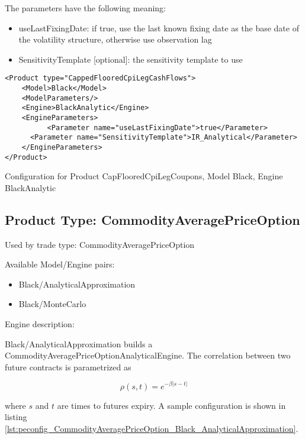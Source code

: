 The parameters have the following meaning:

\begin{itemize}
\item useLastFixingDate: if true, use the last known fixing date as the base date of the volatility structure, otherwise
  use observation lag        
\item SensitivityTemplate [optional]: the sensitivity template to use 
\end{itemize}

\begin{longlisting}
\begin{verbatim}
<Product type="CappedFlooredCpiLegCashFlows">
    <Model>Black</Model>
    <ModelParameters/>
    <Engine>BlackAnalytic</Engine>
    <EngineParameters>
          <Parameter name="useLastFixingDate">true</Parameter>
      <Parameter name="SensitivityTemplate">IR_Analytical</Parameter>
    </EngineParameters>
</Product>
\end{verbatim}
\caption{Configuration for Product CapFlooredCpiLegCoupons, Model Black, Engine BlackAnalytic}
\label{lst:peconfig_CappedFlooredCpiLegCashFlows_Black_BlackAnalytic}
\end{longlisting}

\subsection{Product Type: CommodityAveragePriceOption}

Used by trade type: CommodityAveragePriceOption

Available Model/Engine pairs:

\begin{itemize}
\item Black/AnalyticalApproximation
\item Black/MonteCarlo
\end{itemize}

Engine description:

Black/AnalyticalApproximation builds a CommodityAveragePriceOptionAnalyticalEngine. The correlation between two future
contracts is parametrized as

$$\rho(s, t) = e^{-\beta |s-t|}$$

where $s$ and $t$ are times to futures expiry. A sample configuration is shown in listing
\ref{lst:peconfig_CommodityAveragePriceOption_Black_AnalyticalApproximation}.


